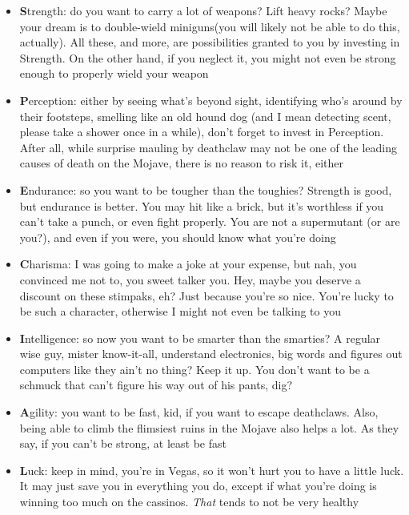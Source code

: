\documentclass[11pt]{article} %
\begin{document}
\begin{itemize}
\item \textbf{S}trength: do you want to carry a lot of weapons? Lift heavy rocks? Maybe your dream is to double-wield miniguns(you will likely not be able to do this, actually). All these, and more, are possibilities granted to you by investing in Strength. On the other hand, if you neglect it, you might not even be strong enough to properly wield your weapon

\item \textbf{P}erception: either by seeing what's beyond sight, identifying who's around by their footsteps, smelling like an old hound dog (and I mean detecting scent, please take a shower once in a while), don't forget to invest in Perception. After all, while surprise mauling by deathclaw may not be one of the leading causes of death on the Mojave, there is no reason to risk it, either

\item \textbf{E}ndurance: so you want to be tougher than the toughies? Strength is good, but endurance is better. You may hit like a brick, but it's worthless if you can't take a punch, or even fight properly. You are not a supermutant (or are you?), and even if you were, you should know what you're doing

\item \textbf{C}harisma: I was going to make a joke at your expense, but nah, you convinced me not to, you sweet talker you. Hey, maybe you deserve a discount on these stimpaks, eh? Just because you're so nice. You're lucky to be such a character, otherwise I might not even be talking to you

\item \textbf{I}ntelligence: so now you want to be smarter than the smarties? A regular wise guy, mister know-it-all, understand electronics, big words and figures out computers like they ain't no thing? Keep it up. You don't want to be a schmuck that can't figure his way out of his pants, dig?

\item \textbf{A}gility: you want to be fast, kid, if you want to escape deathclaws. Also, being able to climb the flimsiest ruins in the Mojave also helps a lot. As they say, if you can't be strong, at least be fast

\item \textbf{L}uck: keep in mind, you're in Vegas, so it won't hurt you to have a little luck. It may just save you in everything you do, except if what you're doing is winning too much on the cassinos. \textit{That} tends to not be very healthy
\end{itemize}
\end{document}
